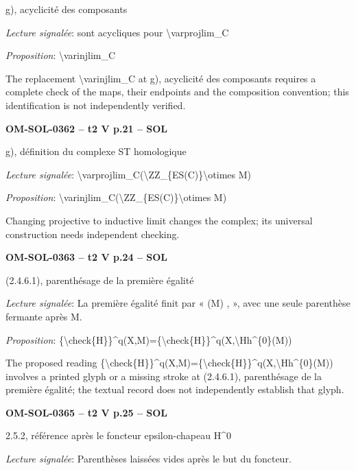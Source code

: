 g), acyclicité des composants\par
\emph{Lecture signalée}: sont acycliques pour \textbackslash{}varprojlim\_C\par
\emph{Proposition}: \textbackslash{}varinjlim\_C\par
The replacement \textbackslash{}varinjlim\_C at g), acyclicité des composants requires a complete check of the maps, their endpoints and the composition convention; this identification is not independently verified.\par
\par\noindent\textbf{OM-SOL-0362 -- t2 V p.21 -- SOL}\par
g), définition du complexe ST homologique\par
\emph{Lecture signalée}: \textbackslash{}varprojlim\_C(\textbackslash{}ZZ\_\{ES(C)\}\textbackslash{}otimes M)\par
\emph{Proposition}: \textbackslash{}varinjlim\_C(\textbackslash{}ZZ\_\{ES(C)\}\textbackslash{}otimes M)\par
Changing projective to inductive limit changes the complex; its universal construction needs independent checking.\par
\par\noindent\textbf{OM-SOL-0363 -- t2 V p.24 -- SOL}\par
(2.4.6.1), parenthésage de la première égalité\par
\emph{Lecture signalée}: La première égalité finit par « (M) , », avec une seule parenthèse fermante après M.\par
\emph{Proposition}: \{\textbackslash{}check\{H\}\}\textasciicircum{}q(X,M)=\allowbreak \{\textbackslash{}check\{H\}\}\textasciicircum{}q(X,\textbackslash{}Hh\textasciicircum{}\{0\}(M))\par
The proposed reading \{\textbackslash{}check\{H\}\}\textasciicircum{}q(X,M)=\allowbreak \{\textbackslash{}check\{H\}\}\textasciicircum{}q(X,\textbackslash{}Hh\textasciicircum{}\{0\}(M)) involves a printed glyph or a missing stroke at (2.4.6.1), parenthésage de la première égalité; the textual record does not independently establish that glyph.\par
\par\noindent\textbf{OM-SOL-0365 -- t2 V p.25 -- SOL}\par
2.5.2, référence après le foncteur epsilon-chapeau H\textasciicircum{}0\par
\emph{Lecture signalée}: Parenthèses laissées vides après le but du foncteur.\par
